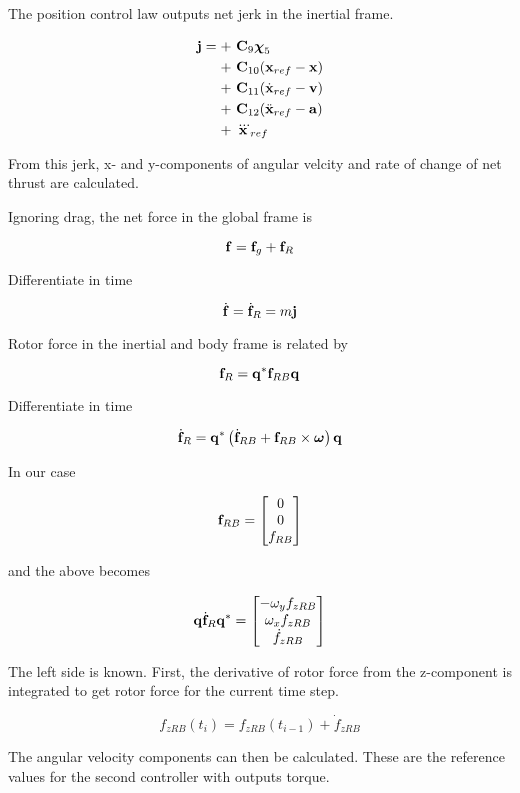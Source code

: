The position control law outputs net jerk in the inertial frame.

\begin{align}\nonumber
\mathbf{j} = + &~ \mathbf{C}_{9} \boldsymbol\chi_5 \\\nonumber
+ &~ \mathbf{C}_{10} (\mathbf{x}_{ref} - \mathbf{x}) \\\nonumber
+ &~ \mathbf{C}_{11} (\dot{\mathbf{x}}_{ref} - \mathbf{v}) \\\nonumber
+ &~ \mathbf{C}_{12} ( \ddot{\mathbf{x}}_{ref} - \mathbf{a} ) \\\nonumber
+ &~ \dddot{\mathbf{x}}_{ref}
\end{align}

From this jerk, x- and y-components of angular velcity and rate of change of net thrust are calculated.

Ignoring drag, the net force in the global frame is

\[
\mathbf{f} = \mathbf{f}_{g} + \mathbf{f}_{R}
\]

Differentiate in time

\[
\dot{\mathbf{f}} = \dot{\mathbf{f}}_{R} = m \mathbf{j}
\]

Rotor force in the inertial and body frame is related by

\[
\mathbf{f}_R = \mathbf{q}^* \mathbf{f}_{RB} \mathbf{q}
\]

Differentiate in time

\[
\dot{\mathbf{f}}_R = \mathbf{q}^* \left( \dot{\mathbf{f}}_{RB} + \mathbf{f}_{RB} \times \boldsymbol \omega \right) \mathbf{q}
\]

In our case

\[
\mathbf{f}_{RB} = \begin{bmatrix} 0 \\ 0 \\ f_{RB} \end{bmatrix}
\]

and the above becomes

\[
\mathbf{q} \dot{\mathbf{f}}_R \mathbf{q}^* =
\begin{bmatrix}
-\omega_y f_{zRB} \\
\omega_x f_{zRB} \\
\dot{f}_{zRB}
\end{bmatrix}
\]

The left side is known. First, the derivative of rotor force from the z-component is integrated to get rotor force for the current time step.

\[
f_{zRB}(t_i) = f_{zRB}(t_{i-1}) + \dot{f}_{zRB}
\]

The angular velocity components can then be calculated. These are the reference values for the second controller with outputs torque.

